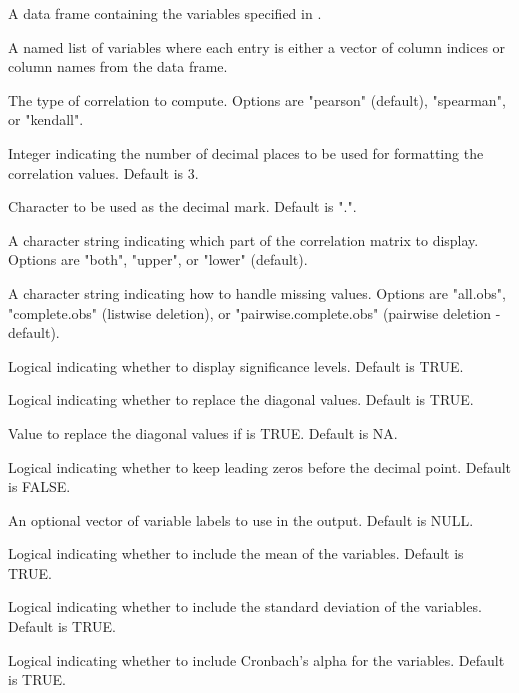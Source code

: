 \documentclass[a4paper]{book}
\begin{document}
\begin{Arguments}
\begin{ldescription}
\item[\code{data}] A data frame containing the variables specified in .

\item[\code{var\_list}] A named list of variables where each entry is either a vector of
column indices or column names from the  data frame.

\item[\code{type}] The type of correlation to compute. Options are
"pearson" (default), "spearman", or "kendall".

\item[\code{digits}] Integer indicating the number of decimal places to be used for
formatting the correlation values. Default is 3.

\item[\code{decimal.mark}] Character to be used as the decimal mark. Default is ".".

\item[\code{triangle}] A character string indicating which part of the correlation
matrix to display. Options are "both", "upper", or "lower" (default).

\item[\code{use}] A character string indicating how to handle missing values.
Options are "all.obs", "complete.obs" (listwise deletion), or
"pairwise.complete.obs" (pairwise deletion - default).

\item[\code{show\_significance}] Logical indicating whether to display
significance levels. Default is TRUE.

\item[\code{replace\_diagonal}] Logical indicating whether to replace the
diagonal values. Default is TRUE.

\item[\code{replacement}] Value to replace the diagonal values if
 is TRUE. Default is NA.

\item[\code{lead.decimal}] Logical indicating whether to keep leading zeros
before the decimal point. Default is FALSE.

\item[\code{var\_labels}] An optional vector of variable labels to use in the output.
Default is NULL.

\item[\code{mean}] Logical indicating whether to include the mean of the variables.
Default is TRUE.

\item[\code{sd}] Logical indicating whether to include the standard deviation of
the variables. Default is TRUE.

\item[\code{alpha}] Logical indicating whether to include Cronbach's alpha for
the variables. Default is TRUE.
\end{ldescription}
\end{Arguments}
\end{document}
